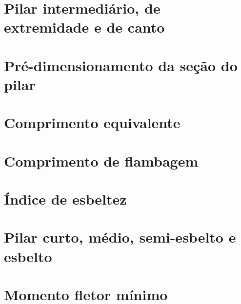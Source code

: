 \documentclass[12pt, a4paper]{article}
\begin{document}
	

	\section{Pilar intermediário, de extremidade e de canto}
	

	\section{Pré-dimensionamento da seção do pilar}
	

	\section{Comprimento equivalente}
	

	\section{Comprimento de flambagem}
	

	\section{Índice de esbeltez}
	

	\section{Pilar curto, médio, semi-esbelto e esbelto}
	

	\section{Momento fletor mínimo}
	
\end{document}
